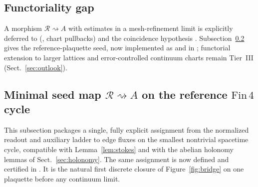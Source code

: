 \documentclass[11pt]{amsart}
\begin{document}
\subsection{Functoriality gap}

A morphism \(\mathcal{R}\rightsquigarrow A\) with estimates in a mesh-refinement limit is explicitly deferred to  (, chart pullbacks) and the coincidence hypothesis . Subsection~\ref{subsec:minimal-seed} gives the reference-plaquette seed, now implemented as  and  in ; functorial extension to larger lattices and error-controlled continuum charts remain Tier~III (Sect.~\ref{sec:outlook}).

\subsection{Minimal seed map \texorpdfstring{$\mathcal{R}\rightsquigarrow A$}{R to A} on the reference \texorpdfstring{$\mathrm{Fin}\,4$}{Fin4} cycle}
\label{subsec:minimal-seed}

This subsection packages a single, fully explicit assignment from the normalized readout and auxiliary ladder to edge fluxes on the smallest nontrivial spacetime cycle, compatible with Lemma~\ref{lem:stokes} and with the abelian holonomy lemmas of Sect.~\ref{sec:holonomy}. The same assignment is now defined and certified in . It is the natural first discrete closure of Figure~\ref{fig:bridge} on one plaquette before any continuum limit.
\end{document}
